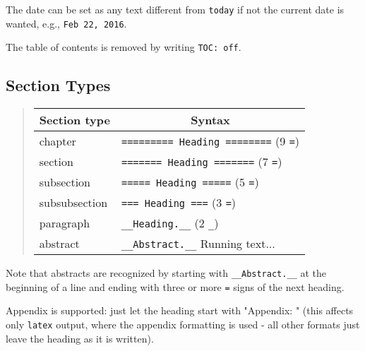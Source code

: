 \documentclass[twoside]{article}
\begin{document}
The date can be set as any text different from {\fontsize{10pt}{10pt}\verb!today!} if not the
current date is wanted, e.g., {\fontsize{10pt}{10pt}\verb!Feb 22, 2016!}.

The table of contents is removed by writing {\fontsize{10pt}{10pt}\verb!TOC: off!}.

\subsection{Section Types}

\label{quick:sections}


\begin{quote}\begin{tabular}{ll}
\hline
\multicolumn{1}{c}{ Section type } & \multicolumn{1}{c}{ Syntax } \\
\hline
chapter                                        & {\fontsize{10pt}{10pt}\verb!========= Heading ========!} (9 {\fontsize{10pt}{10pt}\verb!=!}) \\
section                                        & {\fontsize{10pt}{10pt}\verb!======= Heading =======!}    (7 {\fontsize{10pt}{10pt}\verb!=!}) \\
subsection                                     & {\fontsize{10pt}{10pt}\verb!===== Heading =====!}        (5 {\fontsize{10pt}{10pt}\verb!=!}) \\
subsubsection                                  & {\fontsize{10pt}{10pt}\verb!=== Heading ===!}            (3 {\fontsize{10pt}{10pt}\verb!=!}) \\
paragraph                                      & {\fontsize{10pt}{10pt}\verb!__Heading.__!}               (2 {\fontsize{10pt}{10pt}\verb!_!}) \\
abstract                                       & {\fontsize{10pt}{10pt}\verb!__Abstract.__!} Running text...           \\
\hline
\end{tabular}\end{quote}

\noindent
Note that abstracts are recognized by starting with {\fontsize{10pt}{10pt}\verb!__Abstract.__!} at
the beginning of a line and ending with three or more {\fontsize{10pt}{10pt}\verb!=!} signs of the
next heading.

Appendix is supported: just let the heading start with "Appendix: "
(this affects only {\fontsize{10pt}{10pt}\verb!latex!} output, where the appendix formatting
is used - all other formats just leave the heading as it is written).
\end{document}
